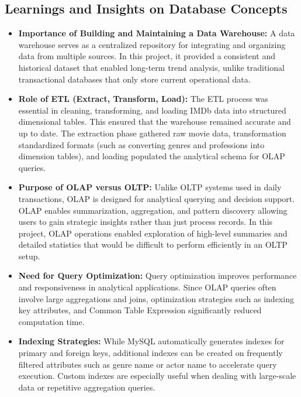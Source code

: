 \documentclass[sigconf, pbalance]{acmart}
\begin{document}
\subsection{Learnings and Insights on Database Concepts}


\begin{itemize}
	\item \textbf{Importance of Building and Maintaining a Data Warehouse:}  
	A data warehouse serves as a centralized repository for integrating and organizing data from multiple sources. In this project, it provided a consistent and historical dataset that enabled long-term trend analysis, unlike traditional transactional databases that only store current operational data.
	
	\item \textbf{Role of ETL (Extract, Transform, Load):}  
	The ETL process was essential in cleaning, transforming, and loading IMDb data into structured dimensional tables. This ensured that the warehouse remained accurate and up to date. The extraction phase gathered raw movie data, transformation standardized formats (such as converting genres and professions into dimension tables), and loading populated the analytical schema for OLAP queries.
	
	\item \textbf{Purpose of OLAP versus OLTP:}  
	Unlike OLTP systems used in daily transactions, OLAP is designed for analytical querying and decision support. OLAP enables summarization, aggregation, and pattern discovery allowing users to gain strategic insights rather than just process records. In this project, OLAP operations enabled exploration of high-level summaries and detailed statistics that would be difficult to perform efficiently in an OLTP setup.
	
	\item \textbf{Need for Query Optimization:}  
	Query optimization improves performance and responsiveness in analytical applications. Since OLAP queries often involve large aggregations and joins, optimization strategies such as indexing key attributes, and Common Table Expression significantly reduced computation time. 
	
	\item \textbf{Indexing Strategies:}  
	While MySQL automatically generates indexes for primary and foreign keys, additional indexes can be created on frequently filtered attributes such as genre name or actor name to accelerate query execution. Custom indexes are especially useful when dealing with large-scale data or repetitive aggregation queries.
\end{itemize}
\end{document}
